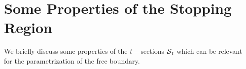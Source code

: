 
\section{Some Properties of the Stopping Region}
We briefly discuss some properties of the $t-$sections $\operatorname{\mathcal{S}}_t$ which can be relevant for the parametrization of the free boundary. 








